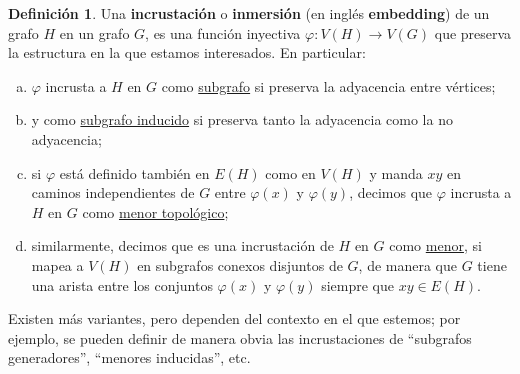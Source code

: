 \documentclass[12pt]{report}
\theoremstyle{plain}
\theoremstyle{definition}
\newtheorem{definition}[theorem]{Definición}
\begin{document}
\begin{definition}
Una \textbf{incrustación} o \textbf{inmersión} (en inglés \textbf{embedding}) de un grafo $H$ en un grafo $G$, es una función inyectiva $\varphi : V(H) \rightarrow V(G)$ que preserva la estructura en la que estamos interesados. En particular:
\begin{enumerate}[(a)]
\item $\varphi$ incrusta a $H$ en $G$ como \underline{subgrafo} si preserva la adyacencia entre vértices;
\item y como \underline{subgrafo inducido} si preserva tanto la adyacencia como la no adyacencia;
\item si $\varphi$ está definido también en $E(H)$ como en $V(H)$ y manda $xy$ en caminos independientes de $G$ entre $\varphi (x)$ y $\varphi (y)$, decimos que $\varphi$ incrusta a $H$ en $G$ como \underline{menor topológico};
\item similarmente, decimos que es una incrustación de $H$ en $G$ como \underline{menor}, si mapea a $V(H)$ en subgrafos conexos disjuntos de $G$, de manera que $G$ tiene una arista entre los conjuntos $\varphi (x)$ y $\varphi (y)$ siempre que $xy \in E(H)$.
\end{enumerate}
Existen más variantes, pero dependen del contexto en el que estemos; por ejemplo, se pueden definir de manera obvia las incrustaciones de ``subgrafos generadores'', ``menores inducidas'', etc.
\end{definition}


\end{document}
